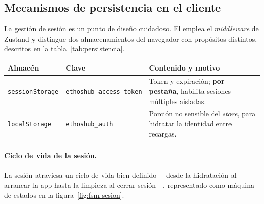 \subsection{Mecanismos de persistencia en el cliente}
\label{subsec:persistencia}

La gestión de sesión es un punto de diseño cuidadoso. El  emplea el
\textit{middleware}  de Zustand y distingue dos almacenamientos del
navegador con propósitos distintos, descritos en la tabla~\ref{tab:persistencia}.

\clearpage
\vspace{0.2cm}
\noindent
\renewcommand{\arraystretch}{1.3}
\fontsize{8.5}{10.2}\selectfont\sffamily
\begin{tabularx}{\textwidth}{|L{3.2cm}|L{3.8cm}|Y|}
\hline
{}
\sffamily\textbf{Almacén} & \sffamily\textbf{Clave} & \sffamily\textbf{Contenido y motivo} \\
\hline
\texttt{sessionStorage} & \texttt{ethoshub\_access\_token} & Token y expiración; \textbf{por pestaña}, habilita sesiones múltiples aisladas. \\ \hline
{}
\texttt{localStorage} & \texttt{ethoshub\_auth} & Porción no sensible del \textit{store}, para hidratar la identidad entre recargas. \\ \hline
\end{tabularx}
\label{tab:persistencia}

\paragraph{Ciclo de vida de la sesión.} La sesión atraviesa un ciclo de vida bien
definido —desde la hidratación al arrancar la app hasta la limpieza al cerrar sesión—,
representado como máquina de estados en la figura~\ref{fig:fsm-sesion}.

